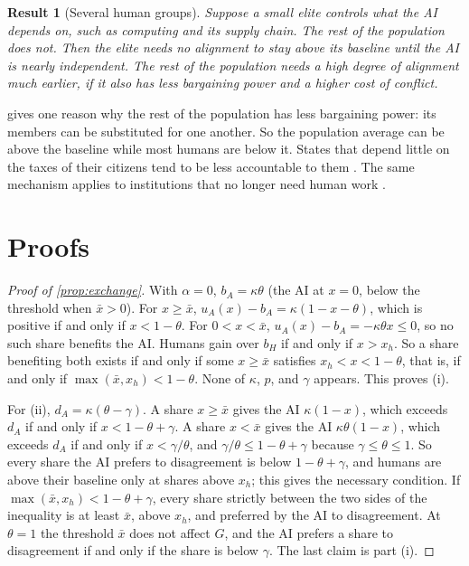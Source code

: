 \documentclass[article, 11pt, reqno]{amsart}
\theoremstyle{named}
\newcommand{\bH}{b_H}
\theoremstyle{plain}
\newtheorem{result}{Result}
\begin{document}
\begin{result}[Several human groups]\label{res:groups}
Suppose a small elite controls what the AI depends on, such as computing and its supply chain. The rest of the population does not. Then the elite needs no alignment to stay above its baseline until the AI is nearly independent. The rest of the population needs a high degree of alignment much earlier, if it also has less bargaining power and a higher cost of conflict.
\end{result}

 gives one reason why the rest of the population has less bargaining power: its members can be substituted for one another. So the population average can be above the baseline while most humans are below it. States that depend little on the taxes of their citizens tend to be less accountable to them \citep{Ross2001}. The same mechanism applies to institutions that no longer need human work \citep{Kulveit2025, DragoLaine2025}.

\section{Proofs}\label{app:proofs}

\begin{proof}[Proof of \cref{prop:exchange}]
With $\alpha = 0$, $b_A = \kappa\theta$ (the AI at $x = 0$, below the threshold when $\bar x > 0$). For $x \ge \bar{x}$, $u_A(x) - b_A = \kappa(1 - x - \theta)$, which is positive if and only if $x < 1 - \theta$. For $0 < x < \bar{x}$, $u_A(x) - b_A = -\kappa\theta x \le 0$, so no such share benefits the AI. Humans gain over $\bH$ if and only if $x > x_h$. So a share benefiting both exists if and only if some $x \ge \bar{x}$ satisfies $x_h < x < 1-\theta$, that is, if and only if $\max(\bar{x}, x_h) < 1 - \theta$. None of $\kappa$, $p$, and $\gamma$ appears. This proves (i).

For (ii), $d_A = \kappa(\theta - \gamma)$. A share $x \ge \bar{x}$ gives the AI $\kappa(1-x)$, which exceeds $d_A$ if and only if $x < 1 - \theta + \gamma$. A share $x < \bar{x}$ gives the AI $\kappa\theta(1-x)$, which exceeds $d_A$ if and only if $x < \gamma/\theta$, and $\gamma/\theta \le 1 - \theta + \gamma$ because $\gamma \le \theta \le 1$. So every share the AI prefers to disagreement is below $1 - \theta + \gamma$, and humans are above their baseline only at shares above $x_h$; this gives the necessary condition. If $\max(\bar{x}, x_h) < 1 - \theta + \gamma$, every share strictly between the two sides of the inequality is at least $\bar{x}$, above $x_h$, and preferred by the AI to disagreement. At $\theta = 1$ the threshold $\bar{x}$ does not affect $G$, and the AI prefers a share to disagreement if and only if the share is below $\gamma$. The last claim is part (i).
\end{proof}
\end{document}
